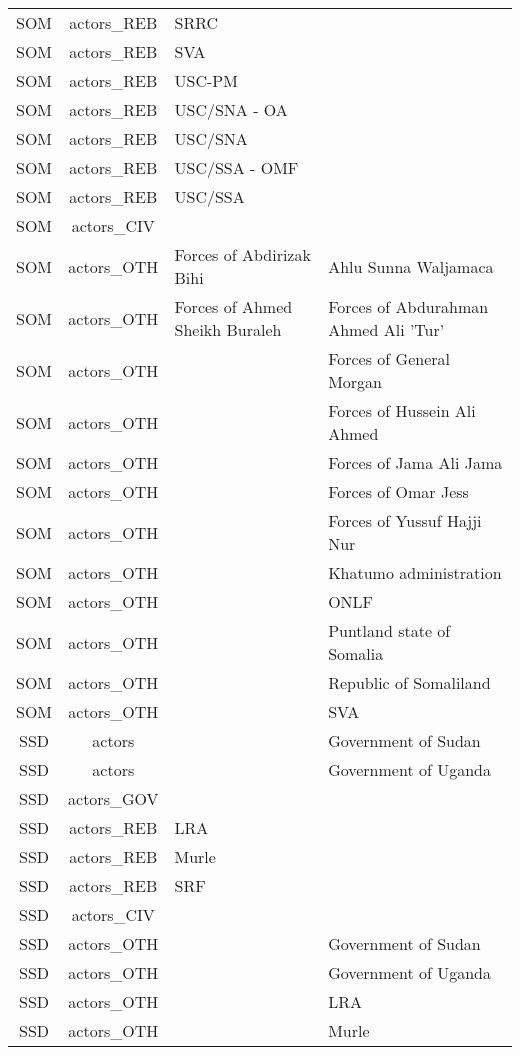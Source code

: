 \documentclass[12pt]{article}
\begin{document}
\begin{center}
\begin{longtable}{|c|c|p{7cm}|p{7cm}|}
  SOM & actors\_REB & SRRC &  \\ 
  SOM & actors\_REB & SVA &  \\ 
  SOM & actors\_REB & USC-PM &  \\ 
  SOM & actors\_REB & USC/SNA - OA &  \\ 
  SOM & actors\_REB & USC/SNA &  \\ 
  SOM & actors\_REB & USC/SSA - OMF &  \\ 
  SOM & actors\_REB & USC/SSA &  \\ 
  SOM & actors\_CIV &  &  \\ 
  SOM & actors\_OTH & Forces of Abdirizak Bihi & Ahlu Sunna Waljamaca \\ 
  SOM & actors\_OTH & Forces of Ahmed Sheikh Buraleh & Forces of Abdurahman Ahmed Ali 'Tur' \\ 
  SOM & actors\_OTH &  & Forces of General Morgan \\ 
  SOM & actors\_OTH &  & Forces of Hussein Ali Ahmed \\ 
  SOM & actors\_OTH &  & Forces of Jama Ali Jama \\ 
  SOM & actors\_OTH &  & Forces of Omar Jess \\ 
  SOM & actors\_OTH &  & Forces of Yussuf Hajji Nur \\ 
  SOM & actors\_OTH &  & Khatumo administration \\ 
  SOM & actors\_OTH &  & ONLF \\ 
  SOM & actors\_OTH &  & Puntland state of Somalia \\ 
  SOM & actors\_OTH &  & Republic of Somaliland \\ 
  SOM & actors\_OTH &  & SVA \\ 
  SSD & actors &  & Government of Sudan \\ 
  SSD & actors &  & Government of Uganda \\ 
  SSD & actors\_GOV &  &  \\ 
  SSD & actors\_REB & LRA &  \\ 
  SSD & actors\_REB & Murle &  \\ 
  SSD & actors\_REB & SRF &  \\ 
  SSD & actors\_CIV &  &  \\ 
  SSD & actors\_OTH &  & Government of Sudan \\ 
  SSD & actors\_OTH &  & Government of Uganda \\ 
  SSD & actors\_OTH &  & LRA \\ 
  SSD & actors\_OTH &  & Murle \\ 

\end{longtable}
\end{center}
\end{document}
